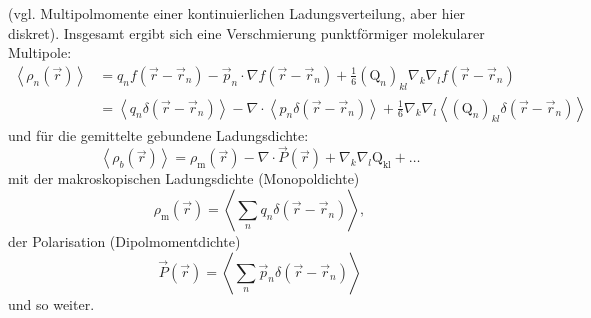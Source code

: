 (vgl. Multipolmomente einer kontinuierlichen Ladungsverteilung, aber hier diskret). Insgesamt ergibt sich eine Verschmierung punktförmiger molekularer Multipole:
\begin{align*}
	\left\langle \rho _{n}\left(\vec {r}\right)\right\rangle &=q_{n}f\left(\vec {r}-\vec {r}_{n}\right)-\vec {p}_{n}\cdot \nabla f\left(\vec {r}-\vec {r}_{n}\right)+\frac{1}{6}\left(\mathrm{Q}_{n}\right)_{kl}\nabla _{k}\nabla _{l}f\left(\vec {r}-\vec {r}_{n}\right) \\&=\left\langle q_{n}\delta \left(\vec {r}-\vec {r}_{n}\right)\right\rangle -\nabla \cdot \left\langle p_{n}\delta \left(\vec {r}-\vec {r}_{n}\right)\right\rangle +\frac{1}{6}\nabla _{k}\nabla _{l}\left\langle \left(\mathrm{Q}_{n}\right)_{kl}\delta \left(\vec {r}-\vec {r}_{n}\right)\right\rangle
\end{align*}
und für die gemittelte gebundene Ladungsdichte:
\begin{equation*}
	\left\langle \rho _{b}\left(\vec {r}\right)\right\rangle =\rho _{\mathrm{m}}\left(\vec {r}\right)-\nabla \cdot \vec {P}\left(\vec {r}\right)+\nabla _{k}\nabla _{l}\mathrm{Q}_{\mathrm{kl}}+\ldots
\end{equation*}
mit der makroskopischen Ladungsdichte (Monopoldichte)
\begin{equation*}
	\rho _{\mathrm{m}}\left(\vec {r}\right)=\left\langle \sum _{n}q_{n}\delta \left(\vec {r}-\vec {r}_{n}\right)\right\rangle ,
\end{equation*}
der Polarisation (Dipolmomentdichte)
\begin{equation*}
	\vec {P}\left(\vec {r}\right)=\left\langle \sum _{n}\vec {p}_{n}\delta \left(\vec {r}-\vec {r}_{n}\right)\right\rangle
\end{equation*}
und so weiter.

